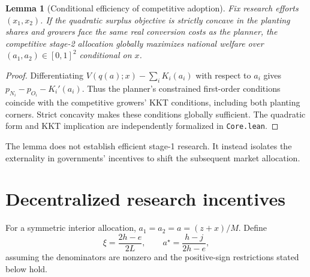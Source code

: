 \documentclass[11pt,a4paper]{article}
\newtheorem{lemma}{Lemma}
\begin{document}
\begin{lemma}[Conditional efficiency of competitive adoption]
Fix research efforts $(x_1,x_2)$. If the quadratic surplus objective is strictly concave in the planting shares and growers face the same real conversion costs as the planner, the competitive stage-2 allocation globally maximizes national welfare over $(a_1,a_2)\in[0,1]^2$ conditional on $x$.
\end{lemma}
\begin{proof}
Differentiating $V(q(a);x)-\sum_iK_i(a_i)$ with respect to $a_i$ gives $p_{N_i}-p_{O_i}-K_i'(a_i)$. Thus the planner's constrained first-order conditions coincide with the competitive growers' KKT conditions, including both planting corners. Strict concavity makes these conditions globally sufficient. The quadratic form and KKT implication are independently formalized in \texttt{Core.lean}.
\end{proof}
The lemma does not establish efficient stage-1 research. It instead isolates the externality in governments' incentives to shift the subsequent market allocation.

\section{Decentralized research incentives}
For a symmetric interior allocation, $a_1=a_2=a=(z+x)/M$. Define
\begin{equation}
 \xi=\frac{2h-e}{2L},\qquad a^\star=\frac{h-j}{2h-e},
 \label{eq:threshold}
\end{equation}
assuming the denominators are nonzero and the positive-sign restrictions stated below hold.
\end{document}
